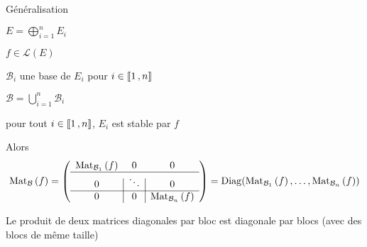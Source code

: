     \begin{prop}{Généralisation}{}
        \begin{soit}
            \item $E = \bigoplus_{i=1}^n E_i$
            \item $f \in \mathcal{L}(E)$
            \item $\mathcal{B}_i$ une base de $E_i$ pour $i \in \left\llbracket 1 \, , n \right\rrbracket$
            \item $\mathcal{B} = \bigcup_{i=1}^n \mathcal{B}_i$
        \end{soit}
        \begin{suppose}
            \item pour tout $i \in \left\llbracket 1 \, , n \right\rrbracket$, $E_i$ est stable par $f$
        \end{suppose}
        Alors 
        \[ \text{Mat}_{\mathcal{B}}\left(f\right) = \left( \begin{array}{c | c | c}
            \text{Mat}_{\mathcal{B}_1}\left(f\right) & 0 & 0 \\
            \hline 
            0 & \ddots & 0 \\
            \hline
            0 & 0 & \text{Mat}_{\mathcal{B}_n}\left(f\right)
        \end{array} \right) = \operatorname{Diag}(\text{Mat}_{\mathcal{B}_1}\left(f\right), \ldots, \text{Mat}_{\mathcal{B}_n}\left(f\right)) \]
    \end{prop}

    \begin{prop}{}{}
        Le produit de deux matrices diagonales par bloc est diagonale par blocs (avec des blocs de même taille)
    \end{prop}

